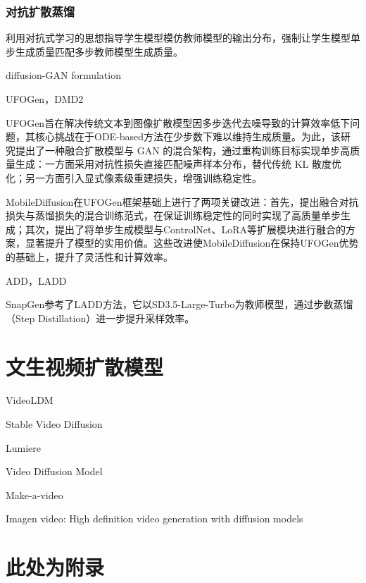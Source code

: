 \documentclass[11pt,a4paper,UTF8]{ctexart}
\begin{document}
\subsubsection{对抗扩散蒸馏}

利用对抗式学习的思想指导学生模型模仿教师模型的输出分布，强制让学生模型单步生成质量匹配多步教师模型生成质量。

diffusion-GAN formulation\cite{wang2022diffusion,xiao2021tackling,xu2024semi}

UFOGen\cite{xu2024ufogen}，DMD2\cite{yin2024improved}

UFOGen\cite{xu2024ufogen}旨在解决传统文本到图像扩散模型因多步迭代去噪导致的计算效率低下问题，其核心挑战在于ODE-based方法在少步数下难以维持生成质量\cite{xu2024semi}。为此，该研究提出了一种融合扩散模型与 GAN 的混合架构，通过重构训练目标实现单步高质量生成：一方面采用对抗性损失直接匹配噪声样本分布，替代传统 KL 散度优化；另一方面引入显式像素级重建损失，增强训练稳定性。

MobileDiffusion\cite{zhao2024mobilediffusion}在UFOGen框架基础上进行了两项关键改进：首先，提出融合对抗损失与蒸馏损失的混合训练范式，在保证训练稳定性的同时实现了高质量单步生成；其次，提出了将单步生成模型与ControlNet、LoRA等扩展模块进行融合的方案，显著提升了模型的实用价值。这些改进使MobileDiffusion在保持UFOGen优势的基础上，提升了灵活性和计算效率。

ADD\cite{sauer2024adversarial}，LADD\cite{sauer2024fast}

SnapGen\cite{hu2024snapgen}参考了LADD方法，它以SD3.5-Large-Turbo为教师模型，通过步数蒸馏（Step Distillation）进一步提升采样效率。



\section{文生视频扩散模型}

VideoLDM\cite{blattmann2023videoldm}

Stable Video Diffusion\cite{blattmann2023stable}

Lumiere\cite{bar2024lumiere}

\cite{esser2023structure}

Video Diffusion Model\cite{ho2022video}

Make-a-video\cite{singer2022make}

Imagen video: High definition video generation with diffusion models

\newpage


\newpage
\appendix


\section{此处为附录}
\end{document}
